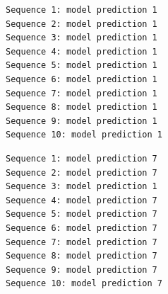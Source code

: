 \documentclass[11pt,a4paper,fleqn]{article}
\begin{document}
\lstset{language=Python}
\lstset{frame=lines}
\lstset{basicstyle=\footnotesize}
\begin{lstlisting}
Sequence 1: model prediction 1
Sequence 2: model prediction 1
Sequence 3: model prediction 1
Sequence 4: model prediction 1
Sequence 5: model prediction 1
Sequence 6: model prediction 1
Sequence 7: model prediction 1
Sequence 8: model prediction 1
Sequence 9: model prediction 1
Sequence 10: model prediction 1
\end{lstlisting}

\lstset{language=Python}
\lstset{frame=lines}
\lstset{basicstyle=\footnotesize}
\begin{lstlisting}
Sequence 1: model prediction 7
Sequence 2: model prediction 7
Sequence 3: model prediction 1
Sequence 4: model prediction 7
Sequence 5: model prediction 7
Sequence 6: model prediction 7
Sequence 7: model prediction 7
Sequence 8: model prediction 7
Sequence 9: model prediction 7
Sequence 10: model prediction 7
\end{lstlisting}
\end{document}
